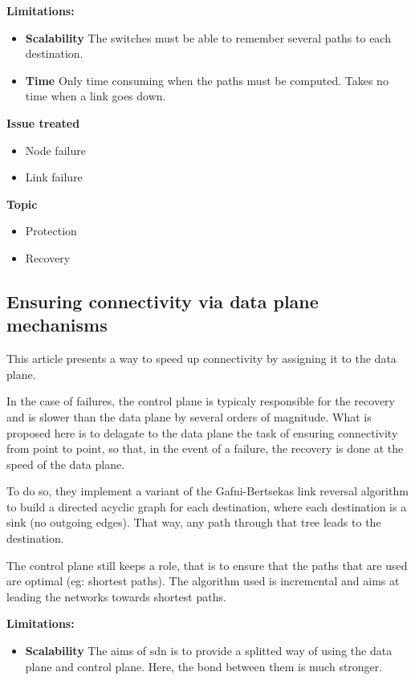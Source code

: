 \documentclass[compsoc]{IEEEtran}
\begin{document}
\textbf{Limitations:}
\begin{itemize}
	\item \textbf{Scalability} The switches must be able to remember several paths to each destination. 
	\item \textbf{Time} Only time consuming when the paths must be computed. Takes no time when a link goes down.
\end{itemize}

\textbf{Issue treated}
\begin{itemize}
	\item Node failure
	\item Link failure
\end{itemize}

\textbf{Topic}
\begin{itemize}
	\item Protection
	\item Recovery
\end{itemize}

\subsection{Ensuring connectivity via data plane mechanisms \cite{Liu:2013:ECV:2482626.2482639}}
This article presents a way to speed up connectivity by assigning it to the data plane.

In the case of failures, the control plane is typicaly responsible for the recovery and is slower than the data plane by several orders of magnitude. What is proposed here is to delagate to the data plane the task of ensuring connectivity from point to point, so that, in the event of a failure, the recovery is done at the speed of the data plane.

To do so, they implement a variant of the Gafni-Bertsekas link reversal algorithm to build a directed acyclic graph for each destination, where each destination is a sink (no outgoing edges). That way, any path through that tree leads to the destination.

The control plane still keeps a role, that is to ensure that the paths that are used are optimal (eg: shortest paths). The algorithm used is incremental and aims at leading the networks towards shortest paths.

\textbf{Limitations:}
\begin{itemize}
	\item \textbf{Scalability} The aims of sdn is to provide a splitted way of using the data plane and control plane. Here, the bond between them is much stronger.
\end{itemize}
\end{document}
